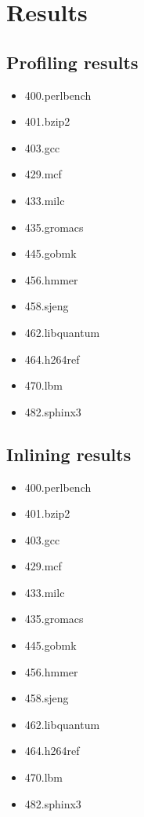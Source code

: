 
\clearpage
\section{Results}
\label{sec:res}



\subsection{Profiling results}
\label{sub:res:profiling}

\begin{multicols}{2}
	\begin{itemize}
		\item 400.perlbench
		\item 401.bzip2
		\item 403.gcc
		\item 429.mcf
		\item 433.milc
		\item 435.gromacs
		\item 445.gobmk
		\item 456.hmmer
		\item 458.sjeng
		\item 462.libquantum
		\item 464.h264ref
		\item 470.lbm
		\item 482.sphinx3
	\end{itemize}
\end{multicols}

\subsection{Inlining results}
\label{sub:res:inlining}

\begin{multicols}{2}
	\begin{itemize}
		\item 400.perlbench
		\item 401.bzip2
		\item 403.gcc
		\item 429.mcf
		\item 433.milc
		\item 435.gromacs
		\item 445.gobmk
		\item 456.hmmer
		\item 458.sjeng
		\item 462.libquantum
		\item 464.h264ref
		\item 470.lbm
		\item 482.sphinx3
	\end{itemize}
\end{multicols}
